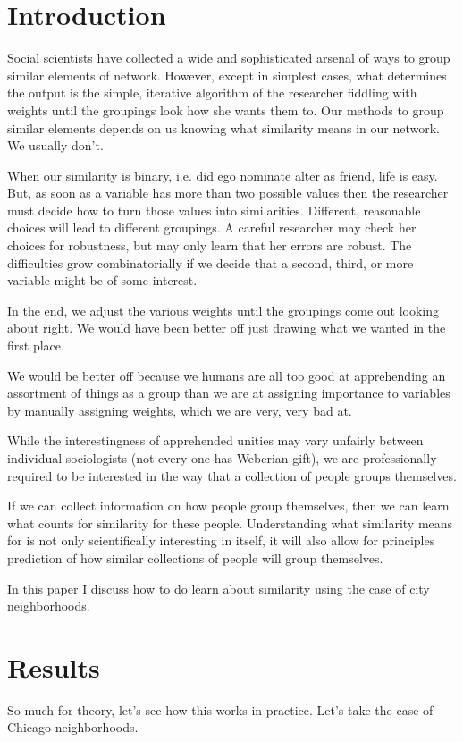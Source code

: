 \documentclass[12pt,letter]{article}
\begin{document}
\section*{Introduction}
Social scientists have collected a wide and sophisticated arsenal of
ways to group similar elements of network. However, except in simplest
cases, what determines the output is the simple, iterative algorithm
of the researcher fiddling with weights until the groupings look how
she wants them to. Our methods to group similar elements depends on us
knowing what similarity means in our network. We usually don't.

When our similarity is binary, i.e. did ego nominate
alter as friend, life is easy. But, as soon as a variable has more
than two possible values then the researcher must decide how to turn
those values into similarities. Different, reasonable choices will
lead to different groupings. A careful researcher may check
her choices for robustness, but may only learn that her errors are
robust. The difficulties grow combinatorially if we decide that
a second, third, or more variable might be of some interest.

In the end, we adjust the various weights until the groupings come out
looking about right. We would have been better off just drawing what
we wanted in the first place.

We would be better off because we humans are all too good at
apprehending an assortment of things as a group than we are at
assigning importance to variables by manually assigning weights, which
we are very, very bad at.

While the interestingness of apprehended unities may vary 
unfairly between individual sociologists (not every one has Weberian gift),
we are professionally required to be interested in the way that a
collection of people groups themselves.

If we can collect information on how people group themselves, then we
can learn what counts for similarity for these people. Understanding
what similarity means for is not only scientifically interesting in
itself, it will also allow for principles prediction of how similar
collections of people will group themselves.

In this paper I discuss how to do learn about similarity using the
case of city neighborhoods. 



\section*{Results}
So much for theory, let's see how this works in practice. Let's take
the case of Chicago neighborhoods.  
\end{document}
